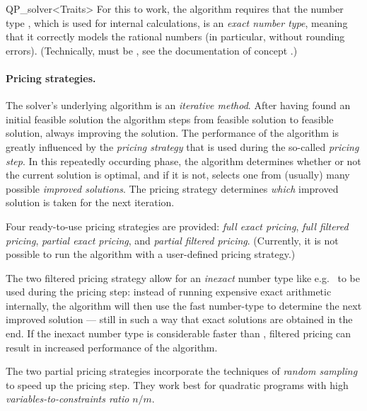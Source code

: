 \begin{ccRefClass}{QP_solver<Traits>}
For this to work, the algorithm requires that the number type
, which is used for internal calculations, is an
\emph{exact number type}, meaning that it correctly models the
rational numbers (in particular, without rounding errors).
(Technically,
 must
be , see the documentation of concept
.)

\paragraph{Pricing strategies.}
The solver's underlying algorithm is an \emph{iterative method}.
After having found an initial feasible solution the algorithm steps
from feasible solution to feasible solution, always improving the
solution.  The performance of the algorithm is greatly influenced by
the \emph{pricing strategy} that is used during the so-called
\emph{pricing step}. In this repeatedly occurding phase, the algorithm
determines whether or not the current solution is optimal, and if it
is not, selects one from (usually) many possible \emph{improved
solutions}. The pricing strategy determines \emph{which} improved
solution is taken for the next iteration.

Four ready-to-use pricing strategies are provided: \emph{full exact
pricing}, \emph{full filtered pricing}, \emph{partial exact pricing},
and \emph{partial filtered pricing}.  (Currently, it is not possible
to run the algorithm with a user-defined pricing strategy.)

The two filtered pricing strategy allow for an \emph{inexact} number
type  like e.g.\  to be used during the
pricing step: instead of running expensive exact arithmetic
internally, the algorithm will then use the fast number-type
 to determine the next improved solution --- still in
such a way that exact solutions are obtained in the end. If the
inexact number type  is considerable faster than
, filtered pricing can result in increased performance
of the algorithm.

The two partial pricing strategies incorporate the techniques of
\emph{random sampling} to speed up the pricing step.  They work best
for quadratic programs with high \emph{variables-to-constraints ratio}
$n/m$.



\end{ccRefClass}
